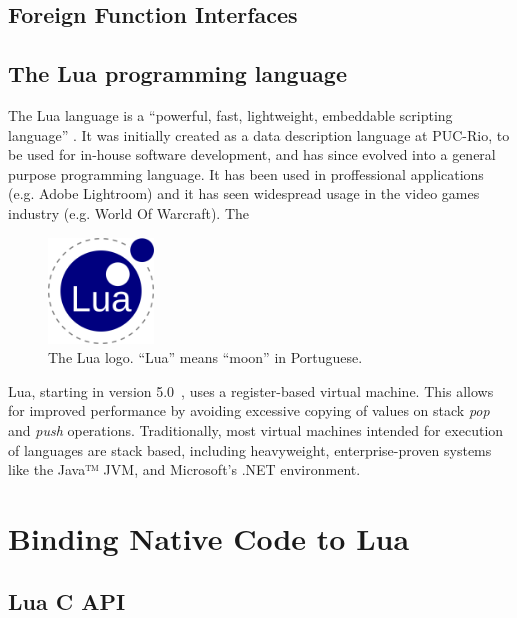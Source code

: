 \subsection{Foreign Function Interfaces}
	\label{sec:context-ffis}


\subsection{The Lua programming language}
	\label{sec:lua-programming-lang}

The Lua language is a “powerful, fast, lightweight, embeddable scripting
language” \cite{lua-about}. It was initially created as a data description
language at \gls{PUC-Rio}, to be used for in-house software development, and
has since evolved into a general purpose programming language. It has been
used in proffessional applications (e.g. Adobe Lightroom) and it has seen
widespread usage in the video games industry (e.g. World Of Warcraft). The

\begin{figure}[h]
	\centering
	\includegraphics[width=0.25\textwidth]{img/lua-logo}
	\caption{The Lua logo. “Lua” means “moon” in Portuguese.}
	\label{fig:lua-logo}
\end{figure}

Lua, starting in version 5.0~\cite{lua50-impl}, uses a register-based virtual
machine. This allows for improved performance by avoiding excessive copying of
values on stack \emph{pop} and \emph{push} operations. Traditionally, most
virtual machines intended for execution of languages are stack based,
including heavyweight, enterprise-proven systems like the Java™ JVM, and
Microsoft's .NET environment.


\section{Binding Native Code to Lua}

\subsection{Lua C API}
	\label{sec:lua-c-api}

